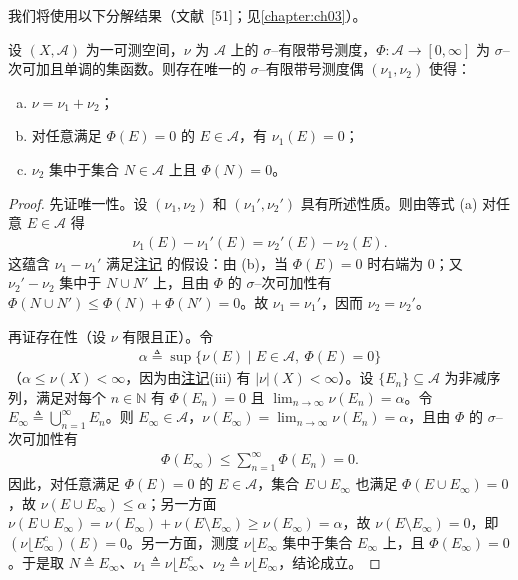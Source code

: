 \documentclass[../../main.tex]{subfiles}%
\begin{document}
我们将使用以下分解结果（文献~[51]；见\cref{chapter:ch03}）。

\begin{proposition}\label{proposition:ch01-FST分解}
设 $(X,\mathcal{A})$ 为一可测空间，$\nu$ 为 $\mathcal{A}$ 上的 $\sigma$--有限带号测度，$\Phi:\mathcal{A}\to[0,\infty]$ 为 $\sigma$--次可加且单调的集函数。则存在唯一的 $\sigma$--有限带号测度偶 $(\nu_1,\nu_2)$ 使得：
\begin{enumerate}[(a)]
\item $\nu=\nu_1+\nu_2$；
\item 对任意满足 $\Phi(E)=0$ 的 $E\in\mathcal{A}$，有 $\nu_1(E)=0$；
\item $\nu_2$ 集中于集合 $N\in\mathcal{A}$ 上且 $\Phi(N)=0$。
\end{enumerate}
\end{proposition}

\begin{proof}
先证唯一性。设 $(\nu_1,\nu_2)$ 和 $(\nu_1',\nu_2')$ 具有所述性质。则由等式 (a) 对任意 $E\in\mathcal{A}$ 得
\begin{align*}
\nu_1(E)-\nu_1'(E)=\nu_2'(E)-\nu_2(E).
\end{align*}
这蕴含 $\nu_1-\nu_1'$ 满足\hyperref[remark:ch01-集中于零容量]{注记} 的假设：由 (b)，当 $\Phi(E)=0$ 时右端为 $0$；又 $\nu_2'-\nu_2$ 集中于 $N\cup N'$ 上，且由 $\Phi$ 的 $\sigma$--次可加性有 $\Phi(N\cup N')\leqslant\Phi(N)+\Phi(N')=0$。故 $\nu_1=\nu_1'$，因而 $\nu_2=\nu_2'$。

再证存在性（设 $\nu$ 有限且正）。令
\begin{align*}
\alpha\triangleq\sup\{\nu(E)\mid E\in\mathcal{A},\ \Phi(E)=0\}
\end{align*}
（$\alpha\leqslant\nu(X)<\infty$，因为由\hyperref[remark:ch01-Jordan性质]{注记}(iii) 有 $|\nu|(X)<\infty$）。设 $\{E_n\}\subseteq\mathcal{A}$ 为非减序列，满足对每个 $n\in\mathbb{N}$ 有 $\Phi(E_n)=0$ 且 $\lim_{n\to\infty}\nu(E_n)=\alpha$。令 $E_\infty\triangleq\bigcup_{n=1}^\infty E_n$。则 $E_\infty\in\mathcal{A}$，$\nu(E_\infty)=\lim_{n\to\infty}\nu(E_n)=\alpha$，且由 $\Phi$ 的 $\sigma$--次可加性有
\begin{align*}
\Phi(E_\infty)\leqslant\sum_{n=1}^\infty\Phi(E_n)=0.
\end{align*}
因此，对任意满足 $\Phi(E)=0$ 的 $E\in\mathcal{A}$，集合 $E\cup E_\infty$ 也满足 $\Phi(E\cup E_\infty)=0$，故 $\nu(E\cup E_\infty)\leqslant\alpha$；另一方面 $\nu(E\cup E_\infty)=\nu(E_\infty)+\nu(E\setminus E_\infty)\geqslant\nu(E_\infty)=\alpha$，故 $\nu(E\setminus E_\infty)=0$，即 $(\nu\lfloor E_\infty^c)(E)=0$。另一方面，测度 $\nu\lfloor E_\infty$ 集中于集合 $E_\infty$ 上，且 $\Phi(E_\infty)=0$。于是取 $N\triangleq E_\infty$、$\nu_1\triangleq\nu\lfloor E_\infty^c$、$\nu_2\triangleq\nu\lfloor E_\infty$，结论成立。
\end{proof}
\end{document}
